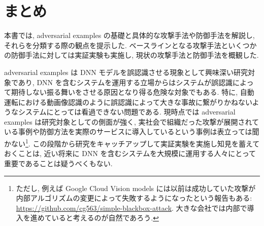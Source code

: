 \section{まとめ}
\label{sec:summary}
本書では, adversarial examples の基礎と具体的な攻撃手法や防御手法を解説し, それらを分類する際の観点を提示した.
ベースラインとなる攻撃手法といくつかの防御手法に対しては実証実験も実施し, 現状の攻撃手法と防御手法を概観した.

adversarial examples は DNN モデルを誤認識させる現象として興味深い研究対象であり, DNN を含むシステムを運用する立場からはシステムが誤認識によって期待しない振る舞いをさせる原因となり得る危険な対象でもある.
特に, 自動運転における動画像認識のように誤認識によって大きな事故に繋がりかねないようなシステムにとっては看過できない問題である.
現時点では adversarial examples は研究対象としての側面が強く, 実社会で組織だった攻撃が展開されている事例や防御方法を実際のサービスに導入しているという事例は表立っては聞かない\footnote{
ただし, 例えば Google Cloud Vision models には以前は成功していた攻撃が内部アルゴリズムの変更によって失敗するようになったという報告もある: \href{https://github.com/cg563/simple-blackbox-attack}{https://github.com/cg563/simple-blackbox-attack}.
大きな会社では内部で導入を進めていると考えるのが自然であろう.
}.
この段階から研究をキャッチアップして実証実験を実施し知見を蓄えておくことは, 近い将来に DNN を含むシステムを大規模に運用する人々にとって重要であることは疑うべくもない.

